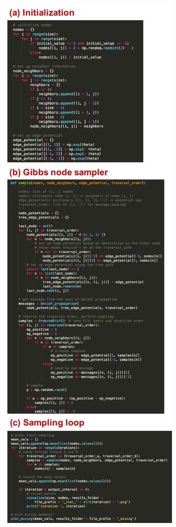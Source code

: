 \documentclass{article}
\begin{document}
\begin{figure}[h]
\centering
\captionsetup[subfigure]{labelformat=empty}
\begin{subfigure}[t]{0.3\textwidth}
\centering
\includegraphics[width=\textwidth]{./computational/code_screenshots/code_1.pdf}

\end{subfigure}
\end{figure}
\end{document}
